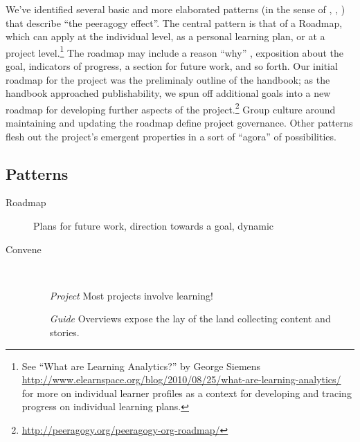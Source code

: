 \documentclass{acm_proc_article-sp}
\begin{document}
We've identified several basic and more elaborated patterns (in the
sense of \cite{Origins}, \cite{Tales}, \cite{vlissides1995design})
that describe ``the peeragogy effect''.  The central pattern is that
of a Roadmap, which can apply at the individual level, as a personal
learning plan, or at a project level.\footnote{See ``What are Learning
  Analytics?'' by George Siemens
  \url{http://www.elearnspace.org/blog/2010/08/25/what-are-learning-analytics/}
  for more on individual learner profiles as a context for developing
  and tracing progress on individual learning plans.}  The roadmap may
include a reason ``why'' \cite{sinek2009start}, exposition about the
goal, indicators of progress, a section for future work, and so forth.
Our initial roadmap for the project was the preliminaly outline of the
handbook; as the handbook approached publishability, we spun off
additional goals into a new roadmap for developing further aspects of
the
project.\footnote{\url{http://peeragogy.org/peeragogy-org-roadmap/}}
Group culture around maintaining and updating the roadmap define
project governance.  Other patterns flesh out the project's emergent
properties in a sort of ``agora'' of possibilities.

\subsection{Patterns} \label{patterns}

\vspace{.2in}
\hspace{.2in}
\begin{minipage}{.4\textwidth}
\begin{description}
\item[Roadmap] Plans for future work, direction towards a goal, dynamic
\item[Convene] \quad \\[-.1in]
\begin{itemize}
\item[\emph{Project}] Most projects involve learning!
\item[\emph{Guide}] Overviews expose the lay of the land collecting content
  and stories.
\end{itemize}
\end{description}
\end{minipage}
\end{document}
